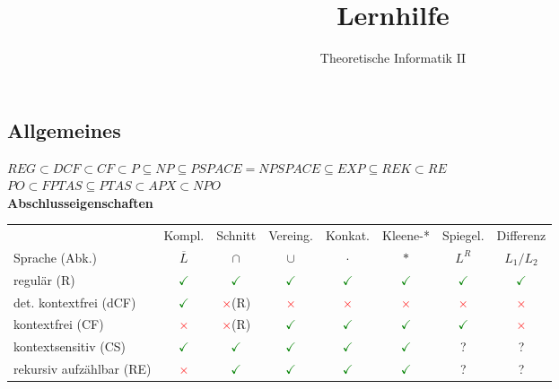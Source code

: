 \documentclass[a4paper,12pt]{article}
\author{Theoretische Informatik II}
\title{ \textbf{Lernhilfe}}
\newcommand{\radio}{\ooalign{\hidewidth$\bullet$\hidewidth\cr$\ocircle$}}
\newcommand{\true}{\textcolor{green}{$\checkmark$}}
\newcommand{\false}{\textcolor{red}{$\times$}}
\begin{document}
	 
	\maketitle	 %
\subsection{Allgemeines}

	$REG \subset DCF \subset CF \subset P \subseteq NP \subseteq PSPACE = NPSPACE \subseteq EXP \subseteq REK  \subset RE$ \\
	$PO \subset FPTAS \subseteq PTAS \subset APX \subset NPO$ \\
	
	\textbf{Abschlusseigenschaften}\\
	\begin{tabular}{l|ccccccc}
		~ & Kompl. & Schnitt & Vereing. & Konkat. & Kleene-* & Spiegel. & Differenz \\
		Sprache (Abk.) & $\overline{L}$ & $\cap$ & $\cup$ & $\cdot$ & $\ast$ & $L^R$ & $L_1/L_2$ \\ \hline
		regul\"ar (R) & \true & \true & \true & \true & \true & \true & \true \\
		det. kontextfrei (dCF) & \true & \false (R) & \false & \false & \false & \false & \false  \\
		kontextfrei (CF) & \false & \false (R) & \true & \true & \true  & \true & \false \\
		kontextsensitiv (CS) & \true & \true & \true & \true & \true & ? & ? \\
		rekursiv aufz\"ahlbar (RE) & \false & \true & \true & \true & \true & ? & ? \\
	\end{tabular}
	
\end{document}
